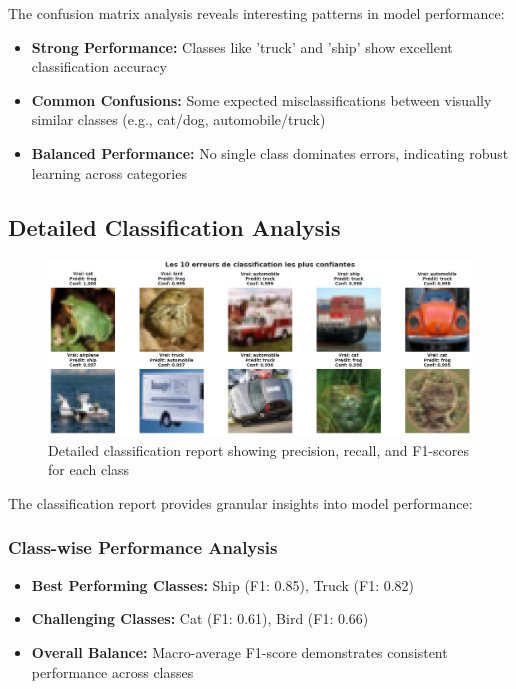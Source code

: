 \documentclass[11pt,a4paper]{article}
\begin{document}
The confusion matrix analysis reveals interesting patterns in model performance:

\begin{itemize}
    \item \textbf{Strong Performance:} Classes like 'truck' and 'ship' show excellent classification accuracy
    \item \textbf{Common Confusions:} Some expected misclassifications between visually similar classes (e.g., cat/dog, automobile/truck)
    \item \textbf{Balanced Performance:} No single class dominates errors, indicating robust learning across categories
\end{itemize}

\subsection{Detailed Classification Analysis}

\begin{figure}[H]
    \centering
    \includegraphics[width=\textwidth]{tp2_cnn_img/cell_21_output_01_image_06.png}
    \caption{Detailed classification report showing precision, recall, and F1-scores for each class}
    \label{fig:classification_report}
\end{figure}

The classification report provides granular insights into model performance:

\subsubsection{Class-wise Performance Analysis}

\begin{itemize}
    \item \textbf{Best Performing Classes:} Ship (F1: 0.85), Truck (F1: 0.82)
    \item \textbf{Challenging Classes:} Cat (F1: 0.61), Bird (F1: 0.66)
    \item \textbf{Overall Balance:} Macro-average F1-score demonstrates consistent performance across classes
\end{itemize}
\end{document}
